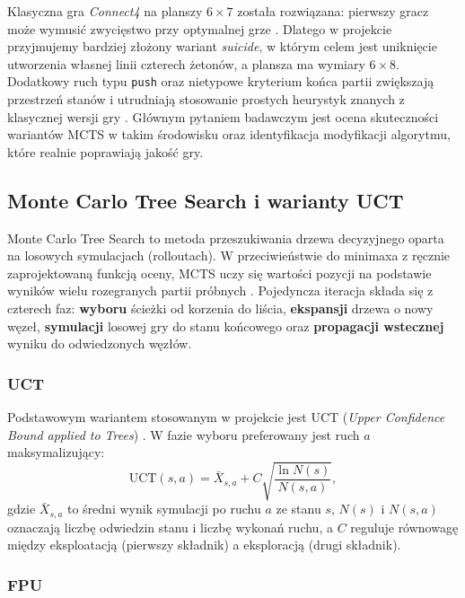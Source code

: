 \documentclass[11pt, a4paper]{article}
\begin{document}
Klasyczna gra \textit{Connect4} na planszy $6 \times 7$ została rozwiązana: pierwszy gracz może wymusić zwycięstwo przy optymalnej grze \cite{allis1988connectfour}. Dlatego w projekcie przyjmujemy bardziej złożony wariant \textit{suicide}, w którym celem jest uniknięcie utworzenia własnej linii czterech żetonów, a plansza ma wymiary $6 \times 8$. Dodatkowy ruch typu \texttt{push} oraz nietypowe kryterium końca partii zwiększają przestrzeń stanów i utrudniają stosowanie prostych heurystyk znanych z klasycznej wersji gry \cite{sheoran2022connect4}. Głównym pytaniem badawczym jest ocena skuteczności wariantów MCTS w takim środowisku oraz identyfikacja modyfikacji algorytmu, które realnie poprawiają jakość gry.

\subsection{Monte Carlo Tree Search i warianty UCT}
\label{sec:mcts-opis}

Monte Carlo Tree Search to metoda przeszukiwania drzewa decyzyjnego oparta na losowych symulacjach (rolloutach). W przeciwieństwie do minimaxa z ręcznie zaprojektowaną funkcją oceny, MCTS uczy się wartości pozycji na podstawie wyników wielu rozegranych partii próbnych \cite{browne2012survey}. Pojedyncza iteracja składa się z czterech faz: \textbf{wyboru} ścieżki od korzenia do liścia, \textbf{ekspansji} drzewa o nowy węzeł, \textbf{symulacji} losowej gry do stanu końcowego oraz \textbf{propagacji wstecznej} wyniku do odwiedzonych węzłów.

\subsubsection{UCT}

Podstawowym wariantem stosowanym w projekcie jest UCT (\textit{Upper Confidence Bound applied to Trees}) \cite{kocsis2006bandit}. W fazie wyboru preferowany jest ruch $a$ maksymalizujący:
\begin{equation*}
    \mathrm{UCT}(s, a) = \bar{X}_{s,a} + C \sqrt{\frac{\ln N(s)}{N(s,a)}},
\end{equation*}
gdzie $\bar{X}_{s,a}$ to średni wynik symulacji po ruchu $a$ ze stanu $s$, $N(s)$ i $N(s,a)$ oznaczają liczbę odwiedzin stanu i liczbę wykonań ruchu, a $C$ reguluje równowagę między eksploatacją (pierwszy składnik) a eksploracją (drugi składnik).

\subsubsection{FPU}
\end{document}
